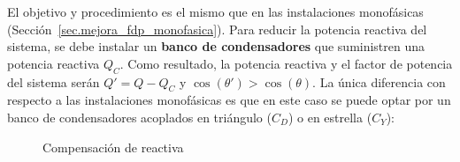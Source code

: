 El objetivo y procedimiento es el mismo que en las instalaciones
monofásicas (Sección~\ref{sec.mejora_fdp_monofasica}). Para reducir la
potencia reactiva del sistema, se debe instalar un \textbf{banco de
  condensadores} que suministren una potencia reactiva $Q_C$. Como
resultado, la potencia reactiva y el factor de potencia del sistema
serán $Q' = Q - Q_C$ y $\cos(\theta') > \cos (\theta)$. La única
diferencia con respecto a las instalaciones monofásicas es que en este
caso se puede optar por un banco de condensadores acoplados en
triángulo ($C_D$) o en estrella ($C_Y$):
\begin{figure}[H]
  \centering
  \hfil
  \caption{Compensación de reactiva}
\end{figure}
